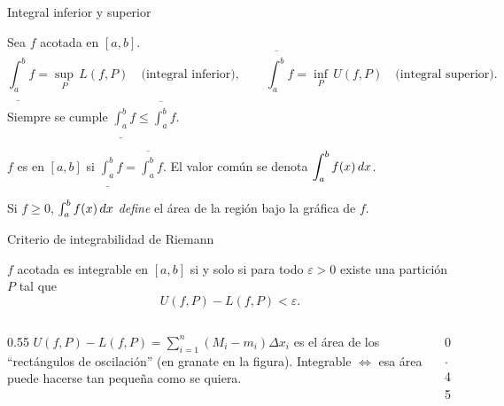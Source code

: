 \documentclass[10pt,aspectratio=169]{beamer}
\begin{document}
\begin{frame}{Integral inferior y superior}
  \begin{definicion}
    Sea $f$ acotada en $[a,b]$.
    \[ \underline{\int_a^b}f=\sup_{P}\,L(f,P)\quad\text{(integral inferior)},\qquad
       \overline{\int_a^b}f=\inf_{P}\,U(f,P)\quad\text{(integral superior)}. \]
    Siempre se cumple $\displaystyle\underline{\int_a^b}f\le\overline{\int_a^b}f$.
  \end{definicion}
  \begin{definicion}
    $f$ es  en $[a,b]$ si $\displaystyle\underline{\int_a^b}f=\overline{\int_a^b}f$.
    El valor común se denota $\displaystyle\int_a^b f(x)\,dx$.
  \end{definicion}
  \begin{observacion}
    Si $f\ge0$, $\int_a^bf(x)\,dx$ \emph{define} el área de la región bajo la gráfica de $f$.
  \end{observacion}
\end{frame}

\begin{frame}{Criterio de integrabilidad de Riemann}
  \begin{teorema}
    $f$ acotada es integrable en $[a,b]$ si y solo si para todo $\varepsilon>0$ existe una partición $P$ tal que
    \[ U(f,P)-L(f,P)<\varepsilon. \]
  \end{teorema}
  \begin{columns}
    \begin{column}{0.55\textwidth}
      $U(f,P)-L(f,P)=\displaystyle\sum_{i=1}^n(M_i-m_i)\Delta x_i$ es el área de los ``rectángulos de
      oscilación'' (en granate en la figura). Integrable $\iff$ esa área puede hacerse tan pequeña como se quiera.
    \end{column}
    \begin{column}{0.45\textwidth}
      \centering
    \end{column}
  \end{columns}
\end{frame}
\end{document}
